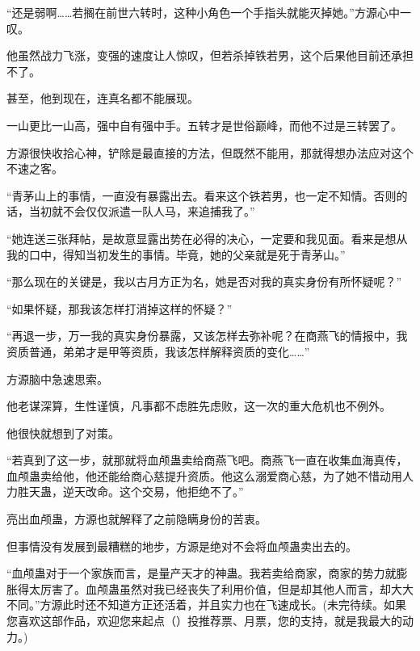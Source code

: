 \begin{this_body}
“还是弱啊……若搁在前世六转时，这种小角色一个手指头就能灭掉她。”方源心中一叹。

他虽然战力飞涨，变强的速度让人惊叹，但若杀掉铁若男，这个后果他目前还承担不了。

甚至，他到现在，连真名都不能展现。

一山更比一山高，强中自有强中手。五转才是世俗巅峰，而他不过是三转罢了。

方源很快收拾心神，铲除是最直接的方法，但既然不能用，那就得想办法应对这个不速之客。

“青茅山上的事情，一直没有暴露出去。看来这个铁若男，也一定不知情。否则的话，当初就不会仅仅派遣一队人马，来追捕我了。”

“她连送三张拜帖，是故意显露出势在必得的决心，一定要和我见面。看来是想从我的口中，得知当初发生的事情。毕竟，她的父亲就是死于青茅山。”

“那么现在的关键是，我以古月方正为名，她是否对我的真实身份有所怀疑呢？”

“如果怀疑，那我该怎样打消掉这样的怀疑？”

“再退一步，万一我的真实身份暴露，又该怎样去弥补呢？在商燕飞的情报中，我资质普通，弟弟才是甲等资质，我该怎样解释资质的变化……”

方源脑中急速思索。

他老谋深算，生性谨慎，凡事都不虑胜先虑败，这一次的重大危机也不例外。

他很快就想到了对策。

“若真到了这一步，就那就将血颅蛊卖给商燕飞吧。商燕飞一直在收集血海真传，血颅蛊卖给他，他还能给商心慈提升资质。他这么溺爱商心慈，为了她不惜动用人力胜天蛊，逆天改命。这个交易，他拒绝不了。”

亮出血颅蛊，方源也就解释了之前隐瞒身份的苦衷。

但事情没有发展到最糟糕的地步，方源是绝对不会将血颅蛊卖出去的。

“血颅蛊对于一个家族而言，是量产天才的神蛊。我若卖给商家，商家的势力就膨胀得太厉害了。血颅蛊虽然对我已经丧失了利用价值，但是却其他人而言，却大大不同。”方源此时还不知道方正还活着，并且实力也在飞速成长。(未完待续。如果您喜欢这部作品，欢迎您来起点（）投推荐票、月票，您的支持，就是我最大的动力。)

\end{this_body}

